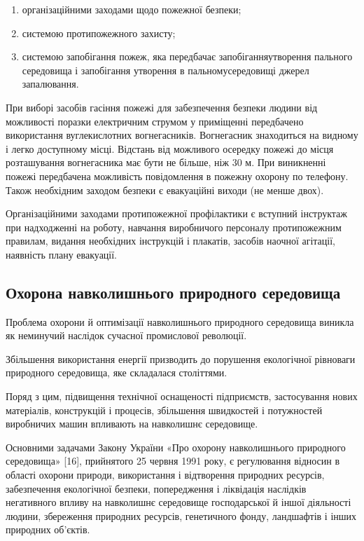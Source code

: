 \begin{enumerate}
	\item організаційними заходами щодо пожежної безпеки;
	\item системою протипожежного захисту;
	\item системою запобігання пожеж, яка передбачає запобігання\newline \hspace*{-18mm}утворення пального середовища і запобігання утворення в пальному\newline \hspace*{-18mm}середовищі джерел запалювання.
\end{enumerate}

При виборі засобів гасіння пожежі для забезпечення безпеки людини від можливості поразки електричним струмом у приміщенні передбачено використання вуглекислотних вогнегасників. Вогнегасник знаходиться на видному і легко доступному місці. Відстань від можливого осередку пожежі до місця розташування вогнегасника має бути не більше, ніж 30 м. При виникненні пожежі передбачена можливість повідомлення в пожежну охорону по телефону. Також необхідним заходом безпеки є евакуаційні виходи (не менше двох).

Організаційними заходами протипожежної профілактики є вступний інструктаж при надходженні на роботу, навчання виробничого персоналу протипожежним правилам, видання необхідних інструкцій і плакатів, засобів наочної агітації, наявність плану евакуації.

\subsection{Охорона навколишнього природного середовища}

Проблема охорони й оптимізації навколишнього природного середовища виникла як неминучий наслідок сучасної промислової революції.

Збільшення використання енергії призводить до порушення екологічної рівноваги природного середовища, яке складалася століттями.

Поряд з цим, підвищення технічної оснащеності підприємств, застосування нових матеріалів, конструкцій і процесів, збільшення швидкостей і потужностей виробничих машин впливають на навколишнє середовище.

Основними задачами Закону України «Про охорону навколишнього природного середовища» [16], прийнятого 25 червня 1991 року, є регулювання відносин в області охорони природи, використання і відтворення природних ресурсів, забезпечення екологічної безпеки, попередження і ліквідація наслідків негативного впливу на навколишнє середовище господарської й іншої діяльності людини, збереження природних ресурсів, генетичного фонду, ландшафтів і інших природних об’єктів.

